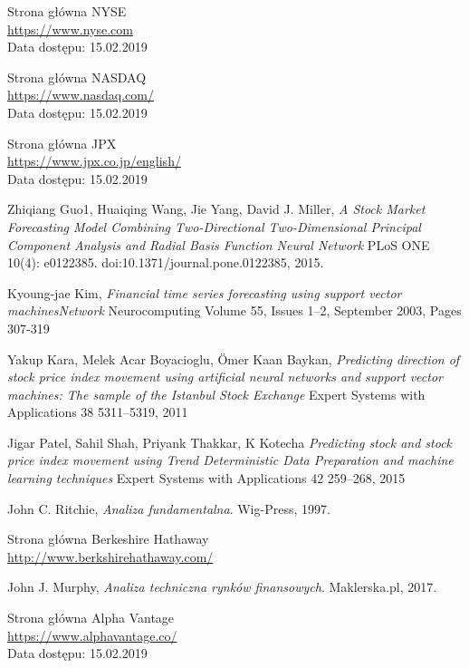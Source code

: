 \documentclass[a4paper, twoside, 11pt, openright]{article}
\begin{document}
\begin{thebibliography}{9}
  
Strona główna NYSE
\\\url{https://www.nyse.com}
\\Data dostępu: 15.02.2019
 
Strona główna NASDAQ
\\\url{https://www.nasdaq.com/}
\\Data dostępu: 15.02.2019

Strona główna JPX
\\\url{https://www.jpx.co.jp/english/}
\\Data dostępu: 15.02.2019

Zhiqiang Guo1, Huaiqing Wang, Jie Yang, David J. Miller,
\textit{A Stock Market Forecasting Model Combining Two-Directional Two-Dimensional Principal Component Analysis and Radial Basis Function Neural Network}
PLoS ONE 10(4): e0122385. doi:10.1371/journal.pone.0122385, 2015.


Kyoung-jae Kim,
\textit{Financial time series forecasting using support vector machinesNetwork}
Neurocomputing Volume 55, Issues 1–2, September 2003, Pages 307-319


Yakup Kara, Melek Acar Boyacioglu, Ömer Kaan Baykan,
\textit{Predicting direction of stock price index movement using artificial neural
networks and support vector machines: The sample of the Istanbul Stock Exchange}
Expert Systems with Applications 38 5311–5319, 2011

Jigar Patel, Sahil Shah, Priyank Thakkar, K Kotecha
\textit{Predicting stock and stock price index movement using Trend
Deterministic Data Preparation and machine learning techniques}
Expert Systems with Applications 42 259–268, 2015

  John C. Ritchie,
  \textit{Analiza fundamentalna}.
  Wig-Press,
  1997.
  
Strona główna Berkeshire Hathaway
\\\url{http://www.berkshirehathaway.com/}

  John J. Murphy,
  \textit{Analiza techniczna rynków finansowych}.
  Maklerska.pl,
  2017.

Strona główna Alpha Vantage
\\\url{https://www.alphavantage.co/}
\\Data dostępu: 15.02.2019


\end{thebibliography}
\end{document}
